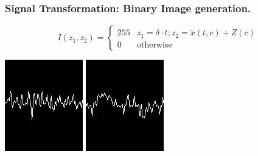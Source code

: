 \documentclass[aspectratio=169]{beamer}
\begin{document}
	\begin{frame}
	\frametitle{Signal Transformation: Binary Image generation.}
	\begin{center}
	
\begin{equation}
I(z_1,z_2) = \left\{ \begin{array}{rl}
255      & z_1 = \delta \cdot t;  z_2 = \tilde{x}(t,c) + Z(c)   \\
0   & \mbox{otherwise}
\end{array}\right. 
\end{equation}

		\includegraphics[scale=2]{images/SignalSample.png} 
		\includegraphics[scale=2]{images/SignalSample2.png} 
		

        \end{center}
    \end{frame}


    
\end{document}
